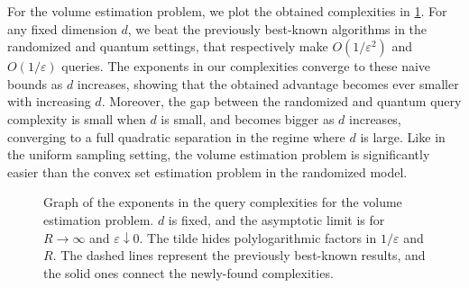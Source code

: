 \documentclass[11pt]{article}
\begin{document}
    For the volume estimation problem, we plot the obtained complexities in \cref{fig:complexities-graph}. For any fixed dimension $d$, we beat the previously best-known algorithms in the randomized and quantum settings, that respectively make $O(1/\varepsilon^2)$ and $O(1/\varepsilon)$ queries. The exponents in our complexities converge to these naive bounds as $d$ increases, showing that the obtained advantage becomes ever smaller with increasing $d$. Moreover, the gap between the randomized and quantum query complexity is small when $d$ is small, and becomes bigger as $d$ increases, converging to a full quadratic separation in the regime where $d$ is large. Like in the uniform sampling setting, the volume estimation problem is significantly easier than the convex set estimation problem in the randomized model.

    \begin{figure}[!ht]
        \centering
        \caption{Graph of the exponents in the query complexities for the volume estimation problem. $d$ is fixed, and the asymptotic limit is for $R \to \infty$ and $\varepsilon \downarrow 0$. The tilde hides polylogarithmic factors in $1/\varepsilon$ and $R$. The dashed lines represent the previously best-known results, and the solid ones connect the newly-found complexities.}
        \label{fig:complexities-graph}
    \end{figure}
\end{document}
